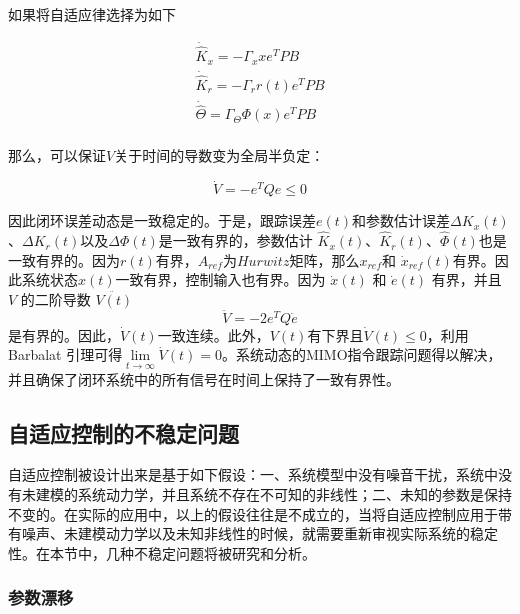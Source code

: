 如果将自适应律选择为如下

\begin{equation}
\begin{array}{l}
 {{\dot {\hat K}}_x} =  - {\Gamma _x}x{e^T}PB \\
 {{\dot {\hat K}}_r} =  - {\Gamma _r}r\left( t \right){e^T}PB \\
 \dot {\hat \Theta } = {\Gamma _\Theta }\Phi \left( x \right){e^T}PB \\
 \end{array}
 \end{equation}

 那么，可以保证$V$关于时间的导数变为全局半负定：

 \begin{equation}
 \dot{V} = -e^TQe \le 0
 \end{equation}

因此闭环误差动态是一致稳定的。于是，跟踪误差$e(t)$和参数估计误差$\Delta K_x(t)$、$\Delta K_r(t)$以及$\Delta \Phi(t)$是一致有界的，参数估计 ${\hat K_x(t)}$、${\hat K_r(t)}$、${\hat \Phi(t)}$也是一致有界的。因为$r(t)$有界，$A_{ref}$为$Hurwitz$矩阵，那么$x_{ref}$和 $\dot x_{ref}(t)$有界。因此系统状态$x(t)$一致有界，控制输入也有界。因为 $\dot{x}(t)$ 和 $\dot{e}(t)$ 有界，并且 $V$ 的二阶导数 $\ddot {V(t)}$
\begin{equation}
\ddot V = -2e^TQ\dot e
\end{equation}
是有界的。因此，$\dot V(t)$一致连续。此外，$V(t)$有下界且$\dot V(t) \le 0$，利用Barbalat 引理\cite{lavretsky2013robust}可得$\mathop {\lim }\limits_{t \to \infty } \dot V\left( t \right) = 0$。系统动态的MIMO指令跟踪问题得以解决，并且确保了闭环系统中的所有信号在时间上保持了一致有界性。


\subsection{自适应控制的不稳定问题 }

自适应控制被设计出来是基于如下假设：一、系统模型中没有噪音干扰，系统中没有未建模的系统动力学，并且系统不存在不可知的非线性；二、未知的参数是保持不变的。在实际的应用中，以上的假设往往是不成立的，当将自适应控制应用于带有噪声、未建模动力学以及未知非线性的时候，就需要重新审视实际系统的稳定性\cite{Luo2010L1,Ioannou2012,lavretsky2013robust}。在本节中，几种不稳定问题将被研究和分析。

\subsubsection{参数漂移}


